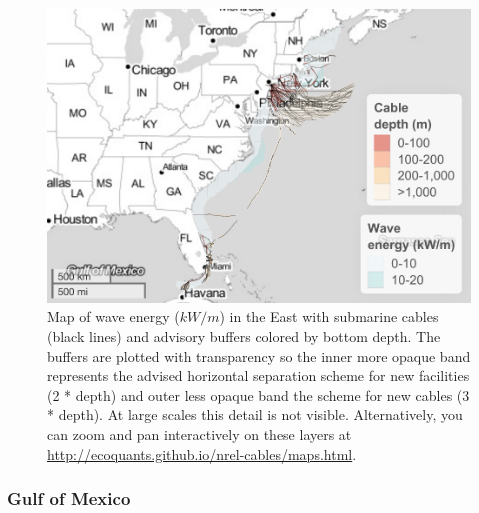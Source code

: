 \documentclass[]{article}
\begin{document}
\begin{figure}
\centering
\includegraphics{report_files/figure-latex/mapWaveEast-1.pdf}
\caption{\label{fig:mapWaveEast}Map of wave energy (\(kW/m\)) in the East
with submarine cables (black lines) and advisory buffers colored by
bottom depth. The buffers are plotted with transparency so the inner
more opaque band represents the advised horizontal separation scheme for
new facilities (2 * depth) and outer less opaque band the scheme for new
cables (3 * depth). At large scales this detail is not visible.
Alternatively, you can zoom and pan interactively on these layers at
\url{http://ecoquants.github.io/nrel-cables/maps.html}.}
\end{figure}

\hypertarget{gulf-of-mexico-1}{%
\subsubsection{Gulf of Mexico}\label{gulf-of-mexico-1}}
\end{document}

